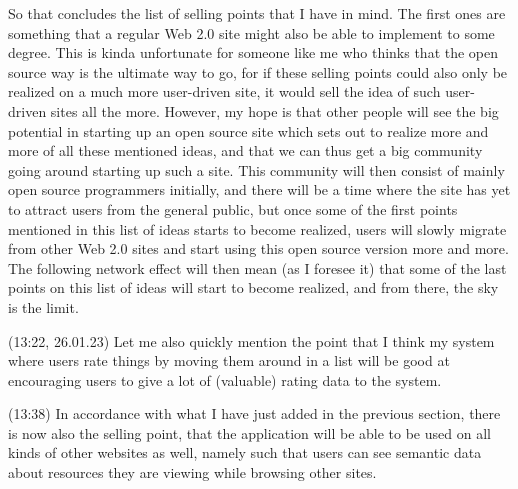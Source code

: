\documentclass{report}
\begin{document}
So that concludes the list of selling points that I have in mind. The first ones are something that a regular Web 2.0 site might also be able to implement to some degree. This is kinda unfortunate for someone like me who thinks that the open source way is the ultimate way to go, for if these selling points could also only be realized on a much more user-driven site, it would sell the idea of such user-driven sites all the more. However, my hope is that other people will see the big potential in starting up an open source site which sets out to realize more and more of all these mentioned ideas, and that we can thus get a big community going around starting up such a site. This community will then consist of mainly open source programmers initially, and there will be a time where the site has yet to attract users from the general public, but once some of the first points mentioned in this list of ideas starts to become realized, users will slowly migrate from other Web 2.0 sites and start using this open source version more and more. The following network effect will then mean (as I foresee it) that some of the last points on this list of ideas will start to become realized, and from there, the sky is the limit. %

(13:22, 26.01.23) Let me also quickly mention the point that I think my system where users rate things by moving them around in a list will be good at encouraging users to give a lot of (valuable) rating data to the system. 

(13:38) In accordance with what I have just added in the previous section, there is now also the selling point, that the application will be able to be used on all kinds of other websites as well, namely such that users can see semantic data about resources they are viewing while browsing other sites. 
\end{document}
